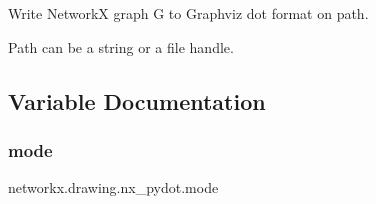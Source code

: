 \begin{DoxyVerb}Write NetworkX graph G to Graphviz dot format on path.

Path can be a string or a file handle.
\end{DoxyVerb}
 

\subsection{Variable Documentation}
\mbox{\label{namespacenetworkx_1_1drawing_1_1nx__pydot_a492e7db939cfb2e188cadd1e7c79bb2b}} 
\subsubsection{\texorpdfstring{mode}{mode}}
{\footnotesize\ttfamily networkx.\+drawing.\+nx\+\_\+pydot.\+mode}

